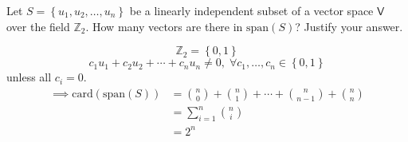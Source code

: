 Let $S =\left\{u_1,u_2,\dots,u_n\right\}$ be a linearly independent
  subset of a vector space $\mathsf{V}$ over the field $\mathbb{Z}_2$. How many
  vectors are there in $\text{span}(S)$? Justify your answer.

\begin{equation}
\mathbb{Z}_2 = \left\{0,1\right\}
\end{equation}
\begin{equation}
c_1u_1 + c_2u_2 + \cdots + c_nu_n \neq 0,\; \forall c_1,\dots,c_n \in \left\{0,1\right\}
\end{equation}
unless all $c_i = 0$.
\begin{align}
\implies \text{card}\left(\text{span}\left(S\right)\right) &=
\binom{n}{0} + \binom{n}{1} + \cdots + \binom{n}{n-1} + \binom{n}{n}\\
&= \sum\limits^n_{i=1}\binom{n}{i}\\
&= 2^n
\end{align}
